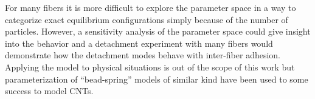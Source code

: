 For many fibers it is more difficult to explore the parameter space in a way to categorize exact equilibrium configurations simply because of the number of particles.
However, a sensitivity analysis of the parameter space could give insight into the behavior and a detachment experiment with many fibers would demonstrate how the detachment modes behave with inter-fiber adhesion.
Applying the model to physical situations is out of the scope of this work but parameterization of ``bead-spring'' models of similar kind have been used to some success to model CNTs.

